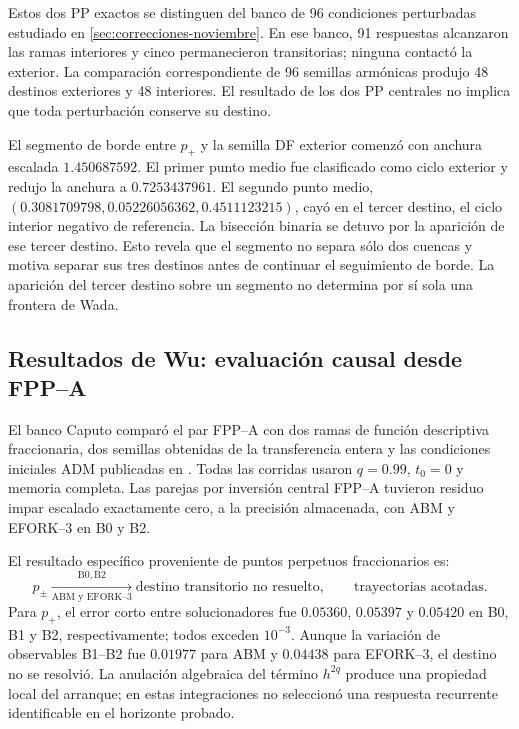 Estos dos PP exactos se distinguen del banco de 96 condiciones perturbadas
estudiado en \cref{sec:correcciones-noviembre}. En ese banco, 91 respuestas
alcanzaron las ramas interiores y cinco permanecieron transitorias; ninguna
contactó la exterior. La comparación correspondiente de 96 semillas armónicas
produjo 48 destinos exteriores y 48 interiores. El resultado de los dos PP
centrales no implica que toda perturbación conserve su destino.

\ifHAFOBasinMaterial
El segmento de borde entre $p_+$ y la semilla DF exterior comenzó con anchura
escalada $1.450687592$. El primer punto medio fue clasificado como ciclo
exterior y redujo la anchura a $0.7253437961$. El segundo punto medio,
$(0.3081709798,0.05226056362,0.4511123215)$, cayó en el tercer destino, el ciclo
interior negativo de referencia. La bisección binaria se detuvo por la aparición
de ese tercer destino. Esto revela que el segmento no separa sólo dos
cuencas y motiva separar sus tres destinos antes de continuar el seguimiento
de borde. La aparición del tercer destino sobre un segmento no determina
por sí sola una frontera de Wada.
\fi

\subsection{Resultados de Wu: evaluación causal desde FPP--A}
\label{subsec:pilot-wu-results}

El banco Caputo comparó el par FPP--A con dos ramas de función descriptiva
fraccionaria, dos semillas obtenidas de la transferencia entera y las
condiciones iniciales ADM publicadas en \cite{Wu2023ArctanChua}. Todas las
corridas usaron $q=0.99$, $t_0=0$ y memoria completa. Las parejas por inversión
central FPP--A tuvieron residuo impar escalado exactamente cero, a la precisión
almacenada, con ABM y EFORK--3 en B0 y B2.

El resultado específico proveniente de puntos perpetuos fraccionarios es:
\begin{equation}
 p_\pm\xrightarrow[\text{ABM y EFORK--3}]{\mathrm{B0,B2}}
 \text{destino transitorio no resuelto},\qquad \text{trayectorias acotadas}.
 \label{pilot:eq-wu-fppa-destination}
\end{equation}
Para $p_+$, el error corto entre solucionadores fue $0.05360$, $0.05397$ y
$0.05420$ en B0, B1 y B2, respectivamente; todos exceden $10^{-3}$. Aunque la
variación de observables B1--B2 fue $0.01977$ para ABM y $0.04438$ para
EFORK--3, el destino no se resolvió. La anulación algebraica del término
$h^{2q}$ produce una propiedad local del arranque; en estas integraciones
no seleccionó una respuesta recurrente identificable en el horizonte probado.

